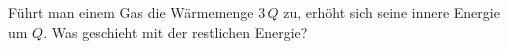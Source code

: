 Führt man einem Gas die Wärmemenge $3\,Q$ zu, erhöht sich seine innere Energie um $Q$. Was geschieht mit der restlichen Energie?
